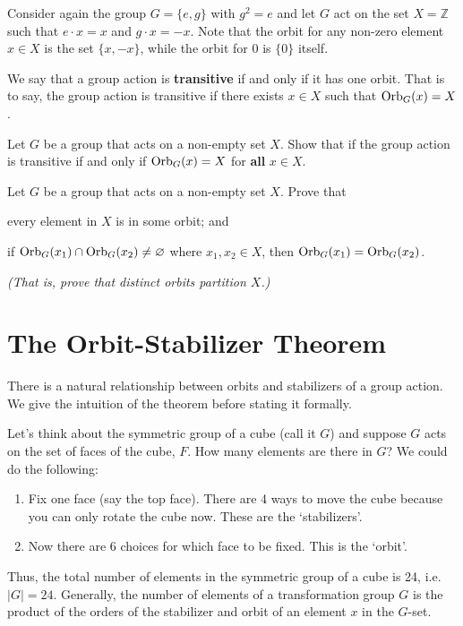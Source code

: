 \begin{example}
    Consider again the group $G = \{e, g\}$ with $g^2 = e$ and let $G$ act on the set $X = \mathbb{Z}$ such that $e \cdot x = x$ and $g \cdot x = -x$. Note that the orbit for any non-zero element $x \in X$ is the set $\{x, -x\}$, while the orbit for 0 is $\{0\}$ itself.
\end{example}

We say that a group action is \textbf{transitive} if and only if it has one orbit. That is to say, the group action is transitive if there exists $x \in X$ such that $\mathrm{Orb}_{G}(x) = X$.

\begin{exercise}
    Let $G$ be a group that acts on a non-empty set $X$. Show that if the group action is transitive if and only if $\mathrm{Orb}_{G}(x) = X$ for \textbf{all} $x \in X$.
\end{exercise}

\begin{exercise}\label{exercise-distinct-orbits-partition-set}
    Let $G$ be a group that acts on a non-empty set $X$. Prove that
    \begin{partquestions}{\alph*}
        \item every element in $X$ is in some orbit; and
        \item if $\mathrm{Orb}_{G}(x_1) \cap \mathrm{Orb}_{G}(x_2) \neq \varnothing$ where $x_1, x_2 \in X$, then $\mathrm{Orb}_{G}(x_1) = \mathrm{Orb}_{G}(x_2)$.
    \end{partquestions}
    \textit{(That is, prove that distinct orbits partition $X$.)}
\end{exercise}

\section{The Orbit-Stabilizer Theorem}
There is a natural relationship between orbits and stabilizers of a group action. We give the intuition of the theorem before stating it formally.

Let's think about the symmetric group of a cube (call it $G$) and suppose $G$ acts on the set of faces of the cube, $F$. How many elements are there in $G$? We could do the following:
\begin{enumerate}
    \item Fix one face (say the top face). There are 4 ways to move the cube because you can only rotate the cube now. These are the `stabilizers'.
    \item Now there are 6 choices for which face to be fixed. This is the `orbit'.
\end{enumerate}
Thus, the total number of elements in the symmetric group of a cube is 24, i.e. $|G| = 24$. Generally, the number of elements of a transformation group $G$ is the product of the orders of the stabilizer and orbit of an element $x$ in the $G$-set.


